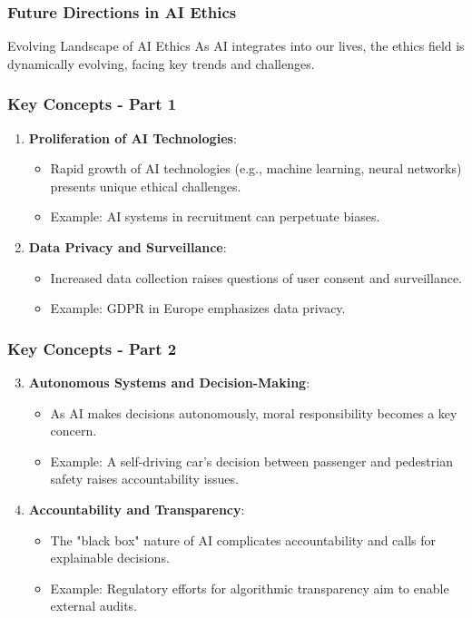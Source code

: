 \documentclass[aspectratio=169]{beamer}
\begin{document}
\begin{frame}[fragile]
    \frametitle{Future Directions in AI Ethics}
    \begin{block}{Evolving Landscape of AI Ethics}
        As AI integrates into our lives, the ethics field is dynamically evolving, facing key trends and challenges.
    \end{block}
\end{frame}

\begin{frame}[fragile]
    \frametitle{Key Concepts - Part 1}
    \begin{enumerate}
        \item \textbf{Proliferation of AI Technologies}:
            \begin{itemize}
                \item Rapid growth of AI technologies (e.g., machine learning, neural networks) presents unique ethical challenges.
                \item Example: AI systems in recruitment can perpetuate biases.
            \end{itemize}
        
        \item \textbf{Data Privacy and Surveillance}:
            \begin{itemize}
                \item Increased data collection raises questions of user consent and surveillance.
                \item Example: GDPR in Europe emphasizes data privacy.
            \end{itemize}
    \end{enumerate}
\end{frame}

\begin{frame}[fragile]
    \frametitle{Key Concepts - Part 2}
    \begin{enumerate}
        \setcounter{enumi}{2} %
        \item \textbf{Autonomous Systems and Decision-Making}:
            \begin{itemize}
                \item As AI makes decisions autonomously, moral responsibility becomes a key concern.
                \item Example: A self-driving car's decision between passenger and pedestrian safety raises accountability issues.
            \end{itemize}

        \item \textbf{Accountability and Transparency}:
            \begin{itemize}
                \item The "black box" nature of AI complicates accountability and calls for explainable decisions.
                \item Example: Regulatory efforts for algorithmic transparency aim to enable external audits.
            \end{itemize}
    \end{enumerate}
\end{frame}
\end{document}
